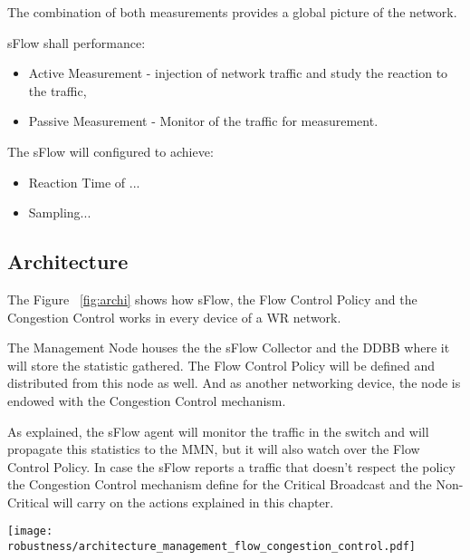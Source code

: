 \noindent The combination of both measurements provides a global picture of the
network.


\vspace{10 mm}

\noindent sFlow shall performance:

\begin{itemize}
	\item Active Measurement - injection of network traffic and study the
reaction to the traffic,
	\item Passive Measurement -  Monitor of the traffic for measurement.
\end{itemize}

\vspace{10 mm}

\noindent The sFlow will configured to achieve:
\begin{itemize}

	\item Reaction Time of ... 
	\item Sampling...
	
\end{itemize}




\subsection{Architecture}


The Figure ~\ref{fig:archi} shows how sFlow, the Flow Control Policy and the
Congestion Control works in every device of a WR network.

The Management Node houses the the sFlow Collector and the DDBB where it will
store the statistic gathered. The Flow Control Policy will be defined and
distributed from this node as well. And as another networking device, the node
is endowed with the Congestion Control mechanism.

As explained, the sFlow agent will monitor the traffic in the switch and will
propagate this statistics to the MMN, but it will also watch over the Flow
Control Policy. In case the sFlow reports a traffic that doesn't respect the
policy the Congestion Control mechanism define for the Critical Broadcast and
the Non-Critical will carry on the actions explained in this chapter.

\begin{center}

        \texttt{[image: robustness/architecture\_management\_flow\_congestion\_control.pdf]}
		\label{fig:archi}
\end{center}




